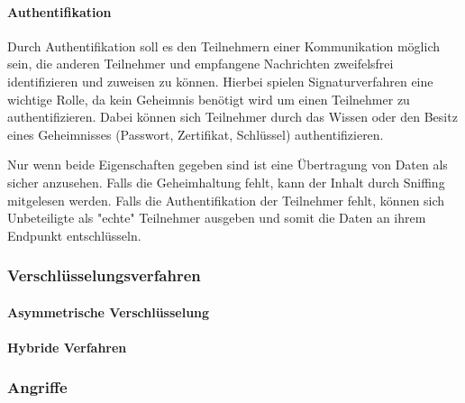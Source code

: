             \paragraph{Authentifikation}
                Durch Authentifikation soll es den Teilnehmern einer Kommunikation möglich sein, die anderen Teilnehmer und empfangene Nachrichten zweifelsfrei identifizieren und zuweisen zu können. Hierbei spielen Signaturverfahren eine wichtige Rolle, da kein Geheimnis benötigt wird um einen Teilnehmer zu authentifizieren. Dabei können sich Teilnehmer durch das Wissen oder den Besitz eines Geheimnisses (Passwort, Zertifikat, Schlüssel) authentifizieren. \cite{BSW.2015}

        Nur wenn beide Eigenschaften gegeben sind ist eine Übertragung von Daten als sicher anzusehen. Falls die Geheimhaltung fehlt, kann der Inhalt durch Sniffing mitgelesen werden. Falls die Authentifikation der Teilnehmer fehlt, können sich Unbeteiligte als "echte" Teilnehmer ausgeben und somit die Daten an ihrem Endpunkt entschlüsseln.

        \subsubsection{Verschlüsselungsverfahren}
            \paragraph{Asymmetrische Verschlüsselung}

            \paragraph{Hybride Verfahren}

        \subsubsection{Angriffe}

            
